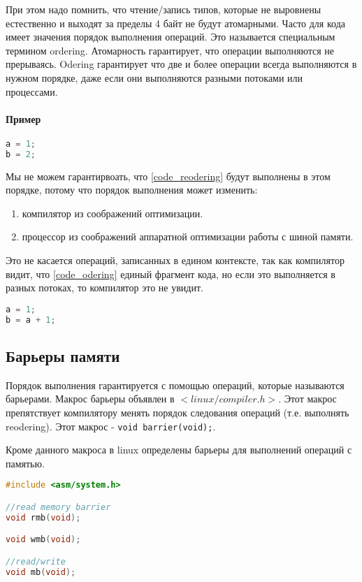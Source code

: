 При этом надо помнить, что чтение/запись типов, которые не выровнены естественно и выходят за пределы 4 байт не будут атомарными. Часто для кода имеет значения порядок выполнения операций. Это называется специальным термином ordering. Атомарность гарантирует, что операции выполняются не прерываясь. Odering гарантирует что две и более операции всегда выполняются в нужном порядке, даже если они выполняются разными потоками или процессами.

\paragraph{Пример}

\begin{lstlisting}[language=c, caption=listing, label=code_reodering]
a = 1;
b = 2;
\end{lstlisting}

Мы не можем гарантирвоать, что \ref{code_reodering} будут выполнены в этом порядке, потому что порядок выполнения может изменить:
\begin{enumerate}[language=c]
	\item компилятор из соображений оптимизации.
	\item процессор из соображений аппаратной оптимизации работы с шиной памяти.
\end{enumerate}

Это не касается операций, записанных в едином контексте, так как компилятор видит, что \ref{code_odering}  единый фрагмент кода, но если это выполняется в разных потоках, то компилятор это не увидит.

\begin{lstlisting}[language=c, caption=listing, label=code_odering]
a = 1;
b = a + 1;
\end{lstlisting}

\subsection{Барьеры памяти}

Порядок выполнения гарантируется с помощью операций, которые называются барьерами. Макрос барьеры объявлен в $<linux/compiler.h>$. Этот макрос препятствует компилятору менять порядок следования операций (т.е. выполнять reodering). Этот макрос - \verb|void barrier(void);|. 

Кроме данного макроса в linux определены барьеры для выполнений операций с памятью.

\begin{lstlisting}[language=c, caption=listing, label=code_macros_rw_bar_mem]
#include <asm/system.h> 

//read memory barrier
void rmb(void);

void wmb(void);

//read/write
void mb(void);
\end{lstlisting}

